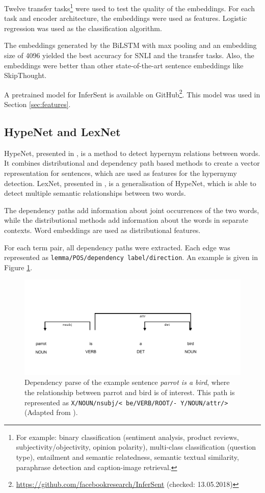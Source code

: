 Twelve transfer tasks\footnote{For example: binary classification (sentiment analysis, product reviews, subjectivity/objectivity, opinion polarity), multi-class classification (question type), entailment and semantic relatedness, semantic textual similarity, paraphrase detection and caption-image retrieval.} were used to test the quality of the embeddings. For each task and encoder architecture, the embeddings were used as features. Logistic regression was used as the classification algorithm.

The embeddings generated by the BiLSTM with max pooling and an embedding size of 4096 yielded the best accuracy for SNLI and the transfer tasks. Also, the embeddings were better than other state-of-the-art sentence embeddings like SkipThought.

A pretrained model for InferSent is available on GitHub\footnote{\url{https://github.com/facebookresearch/InferSent} (checked: 13.05.2018)}. This model was used in Section \ref{sec:features}.

\subsection{HypeNet and LexNet}
\label{sec:lexnet}
HypeNet, presented in \cite{DBLP:conf/acl/ShwartzGD16}, is a method to detect hypernym relations between words. It combines distributional and dependency path based methods to create a vector representation for sentences, which are used as features for the hypernymy detection. LexNet, presented in \cite{DBLP:journals/corr/ShwartzD16}, is a generalisation of HypeNet, which is able to detect multiple semantic relationships between two words.

The dependency paths add information about joint occurrences of the two words, while the distributional methods add information about the words in separate contexts. Word embeddings are used as distributional features.

For each term pair, all dependency paths were extracted. Each edge was represented as \texttt{lemma/POS/dependency label/direction}. An example is given in Figure \ref{fig:hypenet}. 

\begin{figure}[h]
\centering
\caption{Dependency parse of the example sentence \emph{parrot is a bird}, where the relationship between parrot and bird is of interest. This path is represented as \texttt{X/NOUN/nsubj/< be/VERB/ROOT/- Y/NOUN/attr/>} (Adapted from \cite{DBLP:conf/acl/ShwartzGD16}).}
\label{fig:hypenet}
\includegraphics{images/hypenet_example}
\end{figure}


